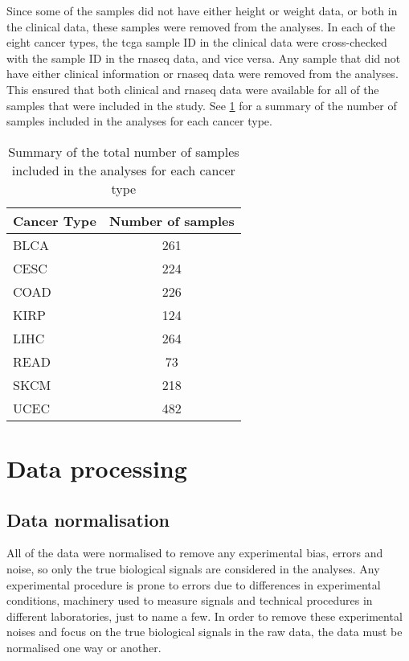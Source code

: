 Since some of the samples did not have either height or weight data, or both in the clinical data, these samples were removed from the analyses.
In each of the eight cancer types, the \gls{tcga} sample ID in the clinical data were cross-checked with the sample ID in the \gls{rnaseq} data, and vice versa.
Any sample that did not have either clinical information or \gls{rnaseq} data were removed from the analyses.
This ensured that both clinical and \gls{rnaseq} data were available for all of the samples that were included in the study.
See \cref{tab:samplesize} for a summary of the number of samples included in the analyses for each cancer type.

\begin{table}[h]
	\caption{Summary of the total number of samples included in the analyses for each cancer type}
	\label{tab:samplesize}
	\begin{center}
		\begin{tabular}{lc}
			Cancer Type   & Number of samples \\
			\hline
			\rule{0pt}{2.25ex}BLCA & 261   \\
			CESC                   & 224   \\
			COAD                   & 226   \\
			KIRP                   & 124   \\
			LIHC                   & 264   \\
			READ                   & 73    \\
			SKCM                   & 218   \\
			UCEC                   & 482   \\
			\hline
			\hline
		\end{tabular}
	\end{center}
\end{table}


\section{Data processing}
\label{sec:datproc}

\subsection{Data normalisation}
\label{sub:data_normalisation}

All of the data were normalised to remove any experimental bias, errors and noise, so only the true biological signals are considered in the analyses.
Any experimental procedure is prone to errors due to differences in experimental conditions, machinery used to measure signals and technical procedures in different laboratories, just to name a few.
In order to remove these experimental noises and focus on the true biological signals in the raw data, the data must be normalised one way or another.

